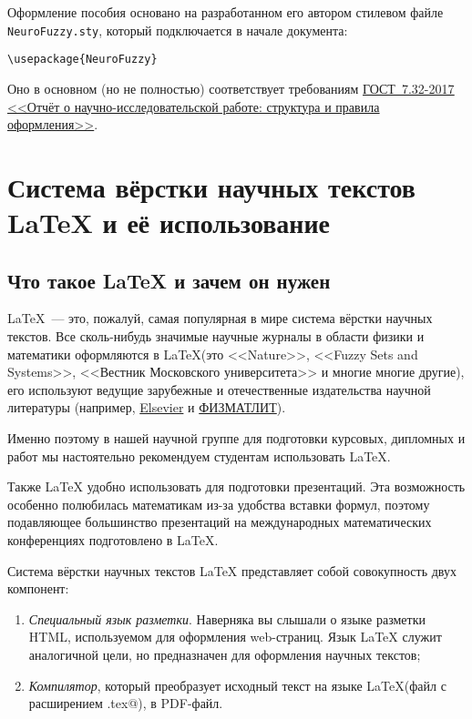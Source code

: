\documentclass[a4paper, 14pt, reqno, oneside]{extbook}
\begin{document}
Оформление пособия основано на разработанном его автором стилевом файле \texttt{NeuroFuzzy.sty}, который подключается в начале документа:
\begin{verbatim}
\usepackage{NeuroFuzzy}
\end{verbatim}
Оно в основном (но не полностью) соответствует требованиям \href{http://www.viniti.ru/docs/sibid/gost732.pdf}{\color{blue}\uline{ГОСТ~7.32-2017 <<Отчёт о научно-исследовательской работе: структура и правила оформления>>}}.

\chapter{Система вёрстки научных текстов \LaTeX\xspace и её использование}
\label{sec:about latex}

\section{Что такое \LaTeX\xspace и зачем он нужен}

\LaTeX~--- это, пожалуй, самая популярная в мире система вёрстки научных текстов. Все сколь-нибудь значимые научные журналы в области физики и математики оформляются в \LaTeX\xspace (это <<Nature>>, <<Fuzzy Sets and Systems>>, <<Вестник Московского университета>> и многие многие другие), его используют ведущие зарубежные и отечественные издательства научной литературы (например, \href{https://www.elsevier.com/}{{Elsevier}} и \href{http://www.fml.ru/}{{\scshape ФИЗМАТЛИТ}}).

Именно поэтому в нашей научной группе для подготовки курсовых, дипломных и \dr работ мы настоятельно рекомендуем студентам использовать \LaTeX.

Также \LaTeX\xspace удобно использовать для подготовки презентаций. Эта возможность особенно полюбилась математикам из-за удобства вставки формул, поэтому подавляющее большинство презентаций на международных математических конференциях подготовлено в \LaTeX.

Система вёрстки научных текстов \LaTeX\xspace представляет собой совокупность двух компонент:
\begin{enumerate}
\item
    \emph{Специальный язык разметки}. Наверняка вы слышали о языке разметки HTML, используемом для оформления web-страниц. Язык \LaTeX\xspace служит аналогичной цели, но предназначен для оформления научных текстов;
\item
    \emph{Компилятор}, который преобразует исходный текст на языке \LaTeX\xspace (файл с расширением \verb@.tex@), в PDF-файл.
\end{enumerate}
\end{document}
